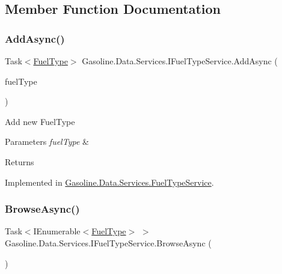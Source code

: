 \subsection{Member Function Documentation}
\mbox{\label{interface_gasoline_1_1_data_1_1_services_1_1_i_fuel_type_service_aca2418fb4b12a5d3b0663cc01647a1fa}} 
\subsubsection{\texorpdfstring{AddAsync()}{AddAsync()}}
{\footnotesize\ttfamily Task$<$\mbox{\hyperlink{class_gasoline_1_1_data_1_1_models_1_1_fuel_type}{Fuel\+Type}}$>$ Gasoline.\+Data.\+Services.\+I\+Fuel\+Type\+Service.\+Add\+Async (\begin{DoxyParamCaption}\item[{\mbox{\hyperlink{class_gasoline_1_1_data_1_1_models_1_1_fuel_type}{Fuel\+Type}}}]{fuel\+Type }\end{DoxyParamCaption})}



Add new Fuel\+Type 


\begin{DoxyParams}{Parameters}
{\em fuel\+Type} & \\
\hline
\end{DoxyParams}
\begin{DoxyReturn}{Returns}

\end{DoxyReturn}


Implemented in \mbox{\hyperlink{class_gasoline_1_1_data_1_1_services_1_1_fuel_type_service_ace9a723344fbcdbd8d8f05a6d93bf56a}{Gasoline.\+Data.\+Services.\+Fuel\+Type\+Service}}.

\mbox{\label{interface_gasoline_1_1_data_1_1_services_1_1_i_fuel_type_service_a7d27b8b4793ab2ac48f24c78d681469b}} 
\subsubsection{\texorpdfstring{BrowseAsync()}{BrowseAsync()}}
{\footnotesize\ttfamily Task$<$I\+Enumerable$<$\mbox{\hyperlink{class_gasoline_1_1_data_1_1_models_1_1_fuel_type}{Fuel\+Type}}$>$ $>$ Gasoline.\+Data.\+Services.\+I\+Fuel\+Type\+Service.\+Browse\+Async (\begin{DoxyParamCaption}{ }\end{DoxyParamCaption})}



